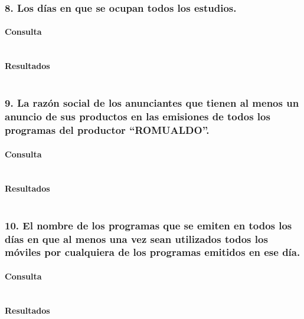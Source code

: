\subsubsection*{8. Los d\'ias en que se ocupan todos los estudios.}

\paragraph{Consulta}
\begin{verbatim} 

\end{verbatim}

\paragraph{Resultados}
\begin{verbatim} 

\end{verbatim} 

\subsubsection*{9. La raz\'on social de los anunciantes que tienen al menos un anuncio de sus productos en las emisiones de todos los programas del productor ``ROMUALDO''.}

\paragraph{Consulta}
\begin{verbatim} 

\end{verbatim}

\paragraph{Resultados}
\begin{verbatim} 

\end{verbatim} 

\subsubsection*{10. El nombre de los programas que se emiten en todos los d\'ias en que al menos una vez sean utilizados todos los m\'oviles por cualquiera de los programas emitidos en ese d\'ia.}

\paragraph{Consulta}
\begin{verbatim} 

\end{verbatim}

\paragraph{Resultados}
\begin{verbatim} 

\end{verbatim} 
